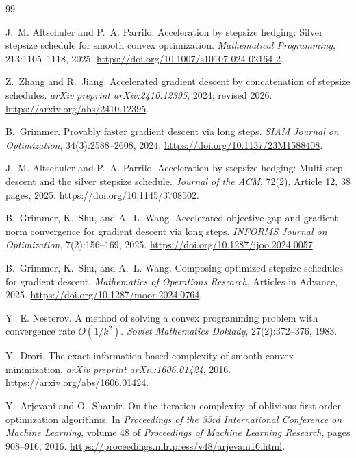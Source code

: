 \documentclass[11pt]{article}
\theoremstyle{definition}
\theoremstyle{remark}
\begin{document}
\small
\begin{thebibliography}{99}

J.~M. Altschuler and P.~A. Parrilo.
\newblock Acceleration by stepsize hedging: Silver stepsize schedule for
smooth convex optimization.
\newblock \emph{Mathematical Programming}, 213:1105--1118, 2025.
\newblock \url{https://doi.org/10.1007/s10107-024-02164-2}.

Z.~Zhang and R.~Jiang.
\newblock Accelerated gradient descent by concatenation of stepsize schedules.
\newblock \emph{arXiv preprint arXiv:2410.12395}, 2024; revised 2026.
\newblock \url{https://arxiv.org/abs/2410.12395}.

B.~Grimmer.
\newblock Provably faster gradient descent via long steps.
\newblock \emph{SIAM Journal on Optimization}, 34(3):2588--2608, 2024.
\newblock \url{https://doi.org/10.1137/23M1588408}.

J.~M. Altschuler and P.~A. Parrilo.
\newblock Acceleration by stepsize hedging: Multi-step descent and the silver
stepsize schedule.
\newblock \emph{Journal of the ACM}, 72(2), Article 12, 38 pages, 2025.
\newblock \url{https://doi.org/10.1145/3708502}.

B.~Grimmer, K.~Shu, and A.~L. Wang.
\newblock Accelerated objective gap and gradient norm convergence for gradient
descent via long steps.
\newblock \emph{INFORMS Journal on Optimization}, 7(2):156--169, 2025.
\newblock \url{https://doi.org/10.1287/ijoo.2024.0057}.

B.~Grimmer, K.~Shu, and A.~L. Wang.
\newblock Composing optimized stepsize schedules for gradient descent.
\newblock \emph{Mathematics of Operations Research}, Articles in Advance,
2025.
\newblock \url{https://doi.org/10.1287/moor.2024.0764}.

Y.~E. Nesterov.
\newblock A method of solving a convex programming problem with convergence
rate \(O(1/k^2)\).
\newblock \emph{Soviet Mathematics Doklady}, 27(2):372--376, 1983.

Y.~Drori.
\newblock The exact information-based complexity of smooth convex
minimization.
\newblock \emph{arXiv preprint arXiv:1606.01424}, 2016.
\newblock \url{https://arxiv.org/abs/1606.01424}.

Y.~Arjevani and O.~Shamir.
\newblock On the iteration complexity of oblivious first-order optimization
algorithms.
\newblock In \emph{Proceedings of the 33rd International Conference on
Machine Learning}, volume 48 of \emph{Proceedings of Machine Learning
Research}, pages 908--916, 2016.
\newblock \url{https://proceedings.mlr.press/v48/arjevani16.html}.


\end{thebibliography}
\end{document}
